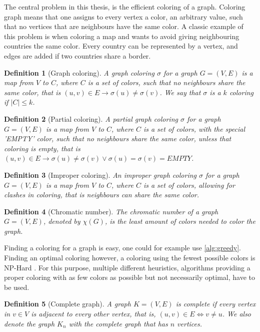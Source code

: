 \documentclass[a4paper]{article}
\newtheorem{definition}{Definition}[section]
\begin{document}
The central problem in this thesis, is the efficient coloring of a graph.
Coloring graph means that one assigns to every vertex a color, an arbitrary
value, such that no vertices that are neighbours have the same color. A classic
example of this problem is when coloring a map and wants to avoid giving
neighbouring countries the same color.  Every country can be represented by a
vertex, and edges are added if two countries share a border.

\begin{definition}[Graph coloring]
    A graph coloring $\sigma$ for a graph $G = (V,E)$ is a map from $V$ to $C$,
    where $C$ is a set of colors, such that no neighbours share the same color,
    that is $(u,v) \in E \to \sigma(u) \neq \sigma(v)$. We say that $\sigma$
    is a $k$ coloring if $|C| \leq k$.
\end{definition}
\begin{definition}[Partial coloring]
    A partial graph coloring $\sigma$ for a graph $G = (V,E)$ is a map from $V$ to $C$,
    where $C$ is a set of colors, with the special 'EMPTY' color, such that no
    neighbours share the same color, unless that coloring is empty, that is
    $(u,v) \in E \to \sigma(u) \neq \sigma(v) \vee \sigma(u) = \sigma(v) = EMPTY$. 
\end{definition}
\begin{definition}[Improper coloring]
    An improper graph coloring $\sigma$ for a graph $G = (V,E)$ is a map from
    $V$ to $C$, where $C$ is a set of colors, allowing for clashes in coloring,
    that is neighbours can share the same color.
\end{definition}
\begin{definition}[Chromatic number]
    The chromatic number of a graph $G = (V,E)$, denoted by $\chi(G)$,
    is the least amount of colors needed to color the graph.
\end{definition}

Finding a coloring for a graph is easy, one could for example use
\autoref{alg:greedy}. Finding an optimal coloring however, a coloring using the
fewest possible colors is NP-Hard \cite{NPHard}. For this purpose, multiple
different heuristics, algorithms providing a proper coloring with as few colors
as possible but not necessarily optimal, have to be used.

\begin{definition}[Complete graph]
    A graph $K = (V,E)$ is complete if every vertex in $v \in V$ is adjacent to
    every other vertex, that is, $ (u,v) \in E \iff v \neq u$. We also denote the graph $K_n$ with the complete graph that
    has $n$ vertices.
\end{definition}
\end{document}
